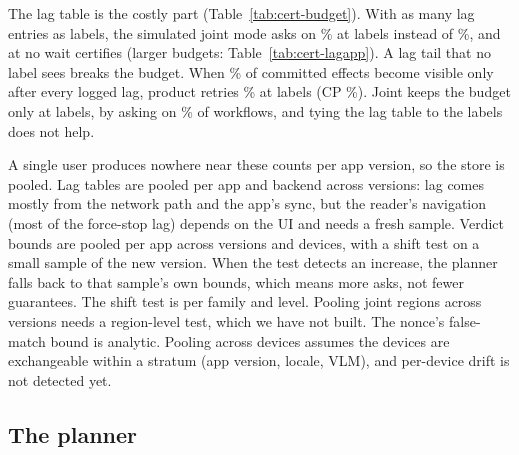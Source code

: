 The lag table is the costly part (Table~\ref{tab:cert-budget}). With as many lag entries as labels, the simulated joint mode asks on \CertTiedFiveJointAsk\% at \CertLabelsFive labels
instead of \RsimFiveJointAsk\%, and at \CertLabelsBase no wait certifies (larger budgets: Table~\ref{tab:cert-lagapp}). A lag tail that no label sees breaks the budget. When
\RsimTail\% of committed effects become visible only after every logged lag, product retries \CertTailFiveProdPv\% at \CertLabelsFive labels (CP \CertTailFiveProdPvHi\%). Joint keeps the
budget only at \CertLabelsBase labels, by asking on \RsimTailJointAsk\% of workflows, and tying the lag table to the labels does not help.


A single user produces nowhere near these counts per app version, so the store is pooled. Lag tables are pooled per app and backend across versions: lag
comes mostly from the network path and the app's sync, but the reader's navigation (most of the force-stop lag) depends on the UI and needs a fresh sample. Verdict bounds are pooled per app across versions and devices, with a shift test on a small sample of the new version.
When the test detects an increase, the planner falls back to that sample's own bounds, which means more asks, not fewer guarantees. The shift test is per family and level.
Pooling joint regions across versions needs a region-level test, which we have not built. The nonce's false-match bound is analytic. Pooling across devices assumes the devices
are exchangeable within a stratum (app version, locale, VLM), and per-device drift is not detected yet.

\subsection{The \alg planner}
\label{sec:design-planner}

